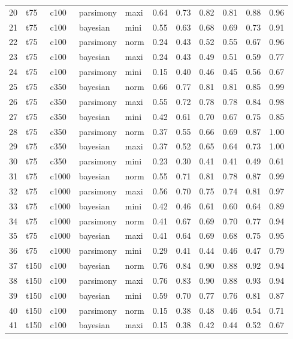 \documentclass[12pt,letterpaper]{article}
\begin{document}
\begin{longtable}{rllllrrrrrr}
  20 & t75 & c100 & parsimony & maxi & 0.64 & 0.73 & 0.82 & 0.81 & 0.88 & 0.96 \\ 
  21 & t75 & c100 & bayesian & mini & 0.55 & 0.63 & 0.68 & 0.69 & 0.73 & 0.91 \\ 
  22 & t75 & c100 & parsimony & norm & 0.24 & 0.43 & 0.52 & 0.55 & 0.67 & 0.96 \\ 
  23 & t75 & c100 & bayesian & maxi & 0.24 & 0.43 & 0.49 & 0.51 & 0.59 & 0.77 \\ 
  24 & t75 & c100 & parsimony & mini & 0.15 & 0.40 & 0.46 & 0.45 & 0.56 & 0.67 \\ 
  25 & t75 & c350 & bayesian & norm & 0.66 & 0.77 & 0.81 & 0.81 & 0.85 & 0.99 \\ 
  26 & t75 & c350 & parsimony & maxi & 0.55 & 0.72 & 0.78 & 0.78 & 0.84 & 0.98 \\ 
  27 & t75 & c350 & bayesian & mini & 0.42 & 0.61 & 0.70 & 0.67 & 0.75 & 0.85 \\ 
  28 & t75 & c350 & parsimony & norm & 0.37 & 0.55 & 0.66 & 0.69 & 0.87 & 1.00 \\ 
  29 & t75 & c350 & bayesian & maxi & 0.37 & 0.52 & 0.65 & 0.64 & 0.73 & 1.00 \\ 
  30 & t75 & c350 & parsimony & mini & 0.23 & 0.30 & 0.41 & 0.41 & 0.49 & 0.61 \\ 
  31 & t75 & c1000 & bayesian & norm & 0.55 & 0.71 & 0.81 & 0.78 & 0.87 & 0.99 \\ 
  32 & t75 & c1000 & parsimony & maxi & 0.56 & 0.70 & 0.75 & 0.74 & 0.81 & 0.97 \\ 
  33 & t75 & c1000 & bayesian & mini & 0.42 & 0.46 & 0.61 & 0.60 & 0.64 & 0.89 \\ 
  34 & t75 & c1000 & parsimony & norm & 0.41 & 0.67 & 0.69 & 0.70 & 0.77 & 0.94 \\ 
  35 & t75 & c1000 & bayesian & maxi & 0.41 & 0.64 & 0.69 & 0.68 & 0.75 & 0.95 \\ 
  36 & t75 & c1000 & parsimony & mini & 0.29 & 0.41 & 0.44 & 0.46 & 0.47 & 0.79 \\ 
  37 & t150 & c100 & bayesian & norm & 0.76 & 0.84 & 0.90 & 0.88 & 0.92 & 0.94 \\ 
  38 & t150 & c100 & parsimony & maxi & 0.76 & 0.83 & 0.90 & 0.88 & 0.93 & 0.94 \\ 
  39 & t150 & c100 & bayesian & mini & 0.59 & 0.70 & 0.77 & 0.76 & 0.81 & 0.87 \\ 
  40 & t150 & c100 & parsimony & norm & 0.15 & 0.38 & 0.48 & 0.46 & 0.54 & 0.71 \\ 
  41 & t150 & c100 & bayesian & maxi & 0.15 & 0.38 & 0.42 & 0.44 & 0.52 & 0.67 \\ 

\end{longtable}
\end{document}
